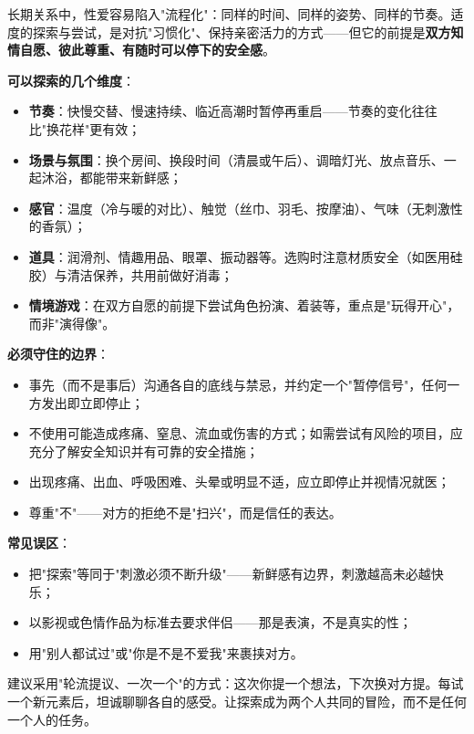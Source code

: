 长期关系中，性爱容易陷入"流程化"：同样的时间、同样的姿势、同样的节奏。适度的探索与尝试，是对抗"习惯化"、保持亲密活力的方式——但它的前提是\textbf{双方知情自愿、彼此尊重、有随时可以停下的安全感}。

\noindent\textbf{可以探索的几个维度}：
\begin{itemize}
	\item \textbf{节奏}：快慢交替、慢速持续、临近高潮时暂停再重启——节奏的变化往往比"换花样"更有效；
	\item \textbf{场景与氛围}：换个房间、换段时间（清晨或午后）、调暗灯光、放点音乐、一起沐浴，都能带来新鲜感；
	\item \textbf{感官}：温度（冷与暖的对比）、触觉（丝巾、羽毛、按摩油）、气味（无刺激性的香氛）；
	\item \textbf{道具}：润滑剂、情趣用品、眼罩、振动器等。选购时注意材质安全（如医用硅胶）与清洁保养，共用前做好消毒；
	\item \textbf{情境游戏}：在双方自愿的前提下尝试角色扮演、着装等，重点是"玩得开心"，而非"演得像"。
\end{itemize}

\noindent\textbf{必须守住的边界}：
\begin{itemize}
	\item 事先（而不是事后）沟通各自的底线与禁忌，并约定一个"暂停信号"，任何一方发出即立即停止；
	\item 不使用可能造成疼痛、窒息、流血或伤害的方式；如需尝试有风险的项目，应充分了解安全知识并有可靠的安全措施；
	\item 出现疼痛、出血、呼吸困难、头晕或明显不适，应立即停止并视情况就医；
	\item 尊重"不"——对方的拒绝不是"扫兴"，而是信任的表达。
\end{itemize}

\noindent\textbf{常见误区}：
\begin{itemize}
	\item 把"探索"等同于"刺激必须不断升级"——新鲜感有边界，刺激越高未必越快乐；
	\item 以影视或色情作品为标准去要求伴侣——那是表演，不是真实的性；
	\item 用"别人都试过"或"你是不是不爱我"来裹挟对方。
\end{itemize}

\begin{tcolorbox}[colback=pink!5!white,colframe=red!50!black,title=贴心小叮咛]
建议采用"轮流提议、一次一个"的方式：这次你提一个想法，下次换对方提。每试一个新元素后，坦诚聊聊各自的感受。让探索成为两个人共同的冒险，而不是任何一个人的任务。
\end{tcolorbox}
